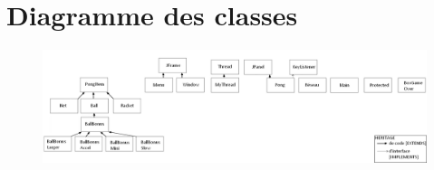 \chapter{Diagramme des classes}


\begin{figure}[h]
 \hspace*{-3.5cm}
 \includegraphics[scale=0.5]{./images/diagramme}
\end{figure}